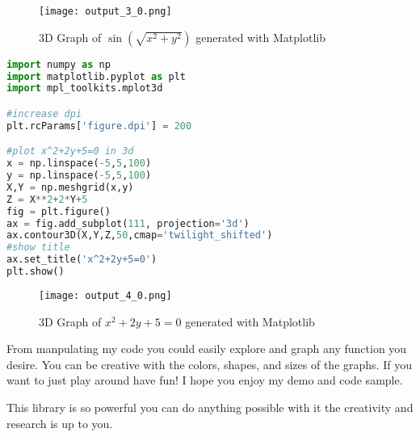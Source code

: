\begin{figure}[H]
\centering
\texttt{[image: output\_3\_0.png]}
\caption{3D Graph of $\sin(\sqrt{x^2+y^2})$ generated with Matplotlib}
\end{figure}

\newpage

\begin{lstlisting}[language=Python]
import numpy as np 
import matplotlib.pyplot as plt 
import mpl_toolkits.mplot3d

#increase dpi
plt.rcParams['figure.dpi'] = 200

#plot x^2+2y+5=0 in 3d
x = np.linspace(-5,5,100)
y = np.linspace(-5,5,100)
X,Y = np.meshgrid(x,y)
Z = X**2+2*Y+5
fig = plt.figure()
ax = fig.add_subplot(111, projection='3d')
ax.contour3D(X,Y,Z,50,cmap='twilight_shifted')
#show title
ax.set_title('x^2+2y+5=0')
plt.show()
\end{lstlisting}
\begin{figure}[H]
\centering
\texttt{[image: output\_4\_0.png]}
\caption{3D Graph of $x^2+2y+5=0$ generated with Matplotlib}
\end{figure}

\newpage
From manpulating my code you could easily explore and graph any function you desire. You can be creative with the colors, shapes, and sizes of the graphs.
If you want to just play around have fun! I hope you enjoy my demo and code sample.

This library is so powerful you can do anything possible with it the creativity and research is up to you.


